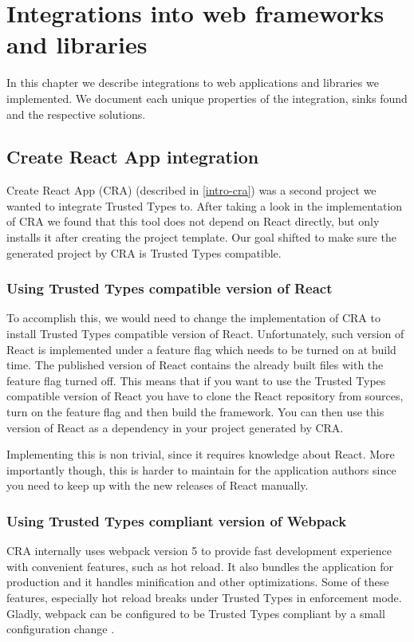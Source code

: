 \chapter{Integrations into web frameworks and libraries}

In this chapter we describe integrations to web applications and libraries we implemented. We
document each unique properties of the integration, sinks found and the respective solutions.

\section{Create React App integration}

Create React App (CRA) (described in \ref{intro-cra}) was a second project we wanted to integrate
Trusted Types to. After taking a look in the implementation of CRA we found that this tool does not
depend on React directly, but only installs it after creating the project template. Our goal shifted
to make sure the generated project by CRA is Trusted Types compatible.

\subsection{Using Trusted Types compatible version of React}

To accomplish this, we would need to change the implementation of CRA to install Trusted Types
compatible version of React. Unfortunately, such version of React is implemented under a feature
flag which needs to be turned on at build time. The published version of React contains the already
built files with the feature flag turned off. This means that if you want to use the Trusted Types
compatible version of React you have to clone the React repository from sources, turn on the feature
flag and then build the framework. You can then use this version of React as a dependency in your
project generated by CRA.

Implementing this is non trivial, since it requires knowledge about React. More importantly though,
this is harder to maintain for the application authors since you need to keep up with the new
releases of React manually.

\subsection{Using Trusted Types compliant version of Webpack}

CRA internally uses webpack version 5 to provide fast development experience with convenient
features, such as hot reload. It also bundles the application for production and it handles
minification and other optimizations. Some of these features, especially hot reload breaks under
Trusted Types in enforcement mode. Gladly, webpack can be configured to be Trusted Types compliant
by a small configuration change \cite{webpack_tt_config}.


